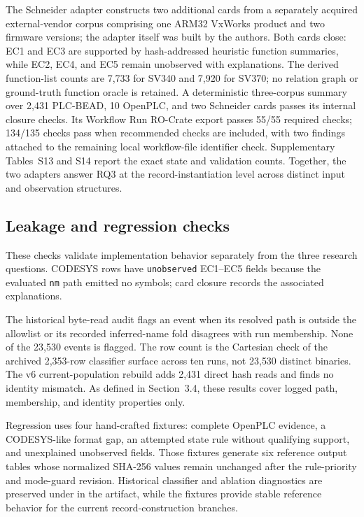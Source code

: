 \documentclass[a4paper,fleqn]{cas-dc}
\begin{document}
The Schneider adapter constructs two additional cards from a separately acquired external-vendor corpus comprising one ARM32 VxWorks product and two firmware versions; the adapter itself was built by the authors. Both cards close: EC1 and EC3 are supported by hash-addressed heuristic function summaries, while EC2, EC4, and EC5 remain unobserved with explanations. The derived function-list counts are 7{,}733 for SV340 and 7{,}920 for SV370; no relation graph or ground-truth function oracle is retained. A deterministic three-corpus summary over 2{,}431 PLC-BEAD, 10 OpenPLC, and two Schneider cards passes its internal closure checks. Its Workflow Run RO-Crate export passes 55/55 required checks; 134/135 checks pass when recommended checks are included, with two findings attached to the remaining local workflow-file identifier check. Supplementary Tables~S13 and S14 report the exact state and validation counts. Together, the two adapters answer RQ3 at the record-instantiation level across distinct input and observation structures.

\subsection{Leakage and regression checks}

These checks validate implementation behavior separately from the three research questions. CODESYS rows have \texttt{unobserved} EC1--EC5 fields because the evaluated \texttt{nm} path emitted no symbols; card closure records the associated explanations.

The historical byte-read audit flags an event when its resolved path is outside the allowlist or its recorded inferred-name fold disagrees with run membership. None of the 23{,}530 events is flagged. The row count is the Cartesian check of the archived 2{,}353-row classifier surface across ten runs, not 23{,}530 distinct binaries. The v6 current-population rebuild adds 2{,}431 direct hash reads and finds no identity mismatch. As defined in Section~3.4, these results cover logged path, membership, and identity properties only.

Regression uses four hand-crafted fixtures: complete OpenPLC evidence, a CODESYS-like format gap, an attempted state rule without qualifying support, and unexplained unobserved fields. Those fixtures generate six reference output tables whose normalized SHA-256 values remain unchanged after the rule-priority and mode-guard revision. Historical classifier and ablation diagnostics are preserved under  in the artifact, while the fixtures provide stable reference behavior for the current record-construction branches.
\end{document}
